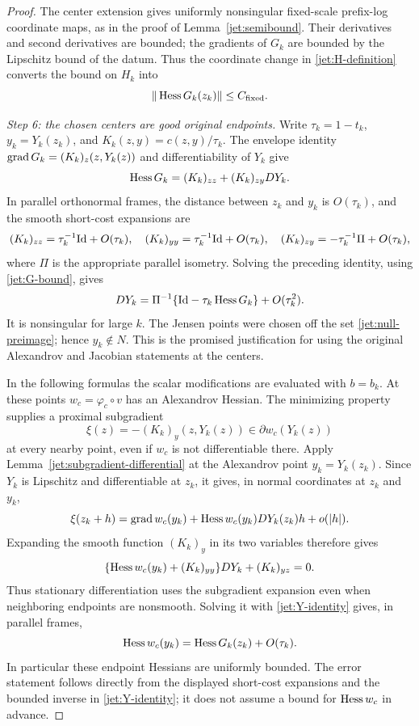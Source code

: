 \begin{proof}
The center extension gives uniformly nonsingular
fixed-scale prefix-log coordinate maps, as in the proof of
Lemma~\ref{jet:semibound}. Their derivatives and second
derivatives are bounded; the gradients of $G_k$ are bounded
by the Lipschitz bound of the datum. Thus the coordinate
change in \eqref{jet:H-definition} converts the bound on
$H_k$ into
\begin{equation}\label{jet:G-bound}
 \|\operatorname{Hess} G_k(z_k)\|\le C_{\mathrm{fixed}}.
\end{equation}

\emph{Step 6: the chosen centers are good original endpoints.}
Write $\tau_k=1-t_k$, $y_k=Y_k(z_k)$, and
$K_k(z,y)=c(z,y)/\tau_k$. The envelope identity
$\operatorname{grad} G_k=(K_k)_z(z,Y_k(z))$ and differentiability of $Y_k$
give
\[
 \operatorname{Hess} G_k=(K_k)_{zz}+(K_k)_{zy}DY_k.
\]
In parallel orthonormal frames, the distance between $z_k$
and $y_k$ is $O(\tau_k)$, and the smooth short-cost expansions
are
\[
 (K_k)_{zz}=\tau_k^{-1}\mathrm{Id}+O(\tau_k),\quad
 (K_k)_{yy}=\tau_k^{-1}\mathrm{Id}+O(\tau_k),\quad
 (K_k)_{zy}=-\tau_k^{-1}\Pi+O(\tau_k),
\]
where $\Pi$ is the appropriate parallel isometry. Solving
the preceding identity, using \eqref{jet:G-bound}, gives
\begin{equation}\label{jet:Y-identity}
 DY_k=\Pi^{-1}\{\mathrm{Id}-\tau_k\operatorname{Hess} G_k\}+O(\tau_k^2).
\end{equation}
It is nonsingular for large $k$. The Jensen points were
chosen off the set \eqref{jet:null-preimage}; hence
$y_k\notin N$. This is the promised justification for
using the original Alexandrov and Jacobian statements at
the centers.

In the following formulas the scalar modifications are evaluated
with $b=b_k$. At these points $w_c=\varphi_c\circ v$ has an Alexandrov
Hessian. The minimizing property supplies a proximal subgradient
\[
 \xi(z)=-(K_k)_y(z,Y_k(z))\in\partial w_c(Y_k(z))
\]
at every nearby point, even if $w_c$ is not differentiable there.
Apply Lemma~\ref{jet:subgradient-differential} at the Alexandrov point
$y_k=Y_k(z_k)$. Since $Y_k$ is Lipschitz and differentiable at
$z_k$, it gives, in normal coordinates at $z_k$ and $y_k$,
\[
 \xi(z_k+h)=\operatorname{grad} w_c(y_k)
       +\operatorname{Hess} w_c(y_k)DY_k(z_k)h+o(|h|).
\]
Expanding the smooth function $(K_k)_y$ in its two variables
therefore gives
\[
 \{\operatorname{Hess} w_c(y_k)+(K_k)_{yy}\}DY_k+(K_k)_{yz}=0.
\]
Thus stationary differentiation uses the subgradient expansion even
when neighboring endpoints are nonsmooth.
Solving it with \eqref{jet:Y-identity} gives, in parallel
frames,
\begin{equation}\label{jet:undo-short}
 \operatorname{Hess} w_c(y_k)=\operatorname{Hess} G_k(z_k)+O(\tau_k).
\end{equation}
In particular these endpoint Hessians are uniformly bounded.
The error statement follows directly from the displayed
short-cost expansions and the bounded inverse in
\eqref{jet:Y-identity}; it does not assume a bound for
$\operatorname{Hess} w_c$ in advance.


\end{proof}
